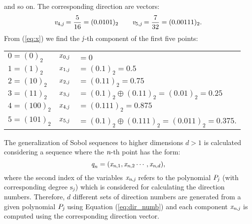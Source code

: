 and so on. The corresponding direction are vectors:
\begin{equation}
\textit{v}_{4,\textit{j}} = \frac{5}{16} = (0.0101)_2  \qquad \textit{v}_{5,\textit{j}} = \frac{7}{32}=(0.00111)_2.
\end{equation}
From (\ref{eq:x}) we find the $\textit{j}$-th component of the first five points:
\begin{center}
\begin{tabular}{ l l l}
 $0 = (0)_2$  & $x_{0, \textit{j}}$ & $= 0$ \\ 
 $1 = (1)_2$ & $x_{1, \textit{j}}$ & $= (0.1)_2 = 0.5$ \\  
 $2 = (10)_2$ & $x_{2, \textit{j}}$ & $= (0.11)_2= 0.75$  \\
$3 = (11)_2$ & $x_{3, \textit{j}}$ & $ = (0.1)_2\oplus (0.11)_2 = (0.01)_2 = 0.25$\\
$4 = (100)_2$ & $x_{4, \textit{j}}$ & $ = (0.111)_2= 0.875$\\
$5 = (101)_2$ & $x_{5, \textit{j}}$ & $ = (0.1)_2\oplus (0.111)_2 = (0.011)_2 = 0.375$.
\end{tabular}
\end{center}

The generalization of Sobol sequences to higher dimensions $d>1$ is calculated considering a sequence where the $\textit{n}$-th point has the form:
\begin{equation}
\textit{q}_{n} = (\textit{x}_{\textit{n}, 1},\textit{x}_{\textit{n}, 2} \cdots, \textit{x}_{\textit{n}, d}),
\end{equation}
where the second index of the variables $\textit{x}_{\textit{n}, \textit{j}}$ refers to the polynomial $P_{\textit{j}}$ (with corresponding degree $\textrm{s}_{\textit{j}}$) which is considered for calculating the direction numbers. Therefore, $d$ different sets of direction numbers are generated from a given polynomial $P_{\textit{j}}$ using Equation (\ref{eq:dir_numb}) and each component $\textit{x}_{\textit{n},\textit{j}}$ is computed using the corresponding direction vector. 